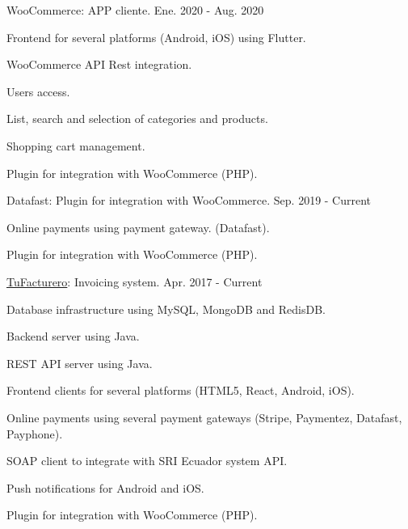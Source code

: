 \begin{cventries}
  \cventry
    {WooCommerce: APP cliente.} %
    {} %
    {} %
    {Ene. 2020 - Aug. 2020} %
    {
      \begin{cvitems} %
        \item {Frontend for several platforms (Android, iOS) using Flutter.}
        \item {WooCommerce API Rest integration.}
        \item {Users access.}
        \item {List, search and selection of categories and products.}
        \item {Shopping cart management.}
        \item {Plugin for integration with WooCommerce (PHP).}
      \end{cvitems}
    }

  \cventry
    {Datafast: Plugin for integration with WooCommerce.} %
    {} %
    {} %
    {Sep. 2019 - Current} %
    {
      \begin{cvitems} %
        \item {Online payments using payment gateway. (Datafast).}
        \item {Plugin for integration with WooCommerce (PHP).}
      \end{cvitems}
    }

  \cventry
    {\href{https://tufacturero.ec}{TuFacturero}: Invoicing system.} %
    {} %
    {} %
    {Apr. 2017 - Current} %
    {
      \begin{cvitems} %
        \item {Database infrastructure using MySQL, MongoDB and RedisDB.}
        \item {Backend server using Java.}
        \item {REST API server using Java.}
        \item {Frontend clients for several platforms (HTML5, React, Android, iOS).}
        \item {Online payments using several payment gateways (Stripe, Paymentez, Datafast, Payphone).}
        \item {SOAP client to integrate with SRI Ecuador system API.}
        \item {Push notifications for Android and iOS.}
        \item {Plugin for integration with WooCommerce (PHP).}
      \end{cvitems}
    }


\end{cventries}
